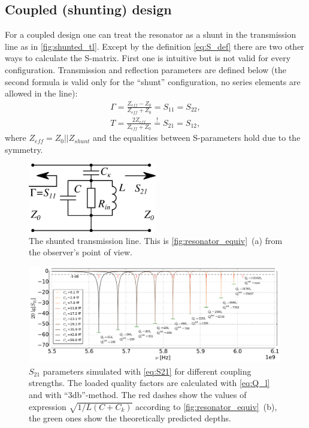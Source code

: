 \documentclass[12pt]{report}
\numberwithin{equation}{section}
\begin{document}
\subsection{Coupled (shunting) design}
For a coupled design one can treat the resonator as a shunt in the transmission line as in \autoref{fig:shunted_tl}. Except by the definition \eqref{eq:S_def} there are two other ways to calculate the S-matrix. First one is intuitive but is not valid for every configuration. Transmission and reflection parameters are defined\cite{Kiselev2013} below (the second formula is valid only for the ``shunt'' configuration, no series elements are allowed in the line):
\begin{gather}    
\Gamma = \frac{Z_{eff} - Z_{0}}{Z_{eff} + Z_{0}} = S_{11} = S_{22}, \label{eGamma}\\
T = \frac{2Z_{eff}}{Z_{eff}+Z_0} \overset{!}{=} S_{21} = S_{12}, \label{eT}
\end{gather}
where $Z_{eff} = Z_0 || Z_{shunt}$ and the equalities between S-parameters hold due to the symmetry.\begin{figure}[h]
\centering
\includegraphics[width=0.5\textwidth]{tl_scheme}
\caption{The shunted transmission line. This is \autoref{fig:resonator_equiv}~(a)  from the observer's point of view.}
\label{fig:shunted_tl}
\end{figure}
\begin{figure}[h]
\centering
\includegraphics[width=0.99\textwidth]{S21s}
\caption{ $S_{21}$ parameters simulated with \eqref{eq:S21} for different coupling strengths. The loaded quality factors are calculated with \eqref{eq:Q_l} and with ``3db''-method. The red dashes show the values of expression $\sqrt{1/L(C+C_k)}$ according to \autoref{fig:resonator_equiv}~(b), the green ones show the theoretically predicted depths.}
\label{fig:S21s}
\end{figure}
\end{document}
